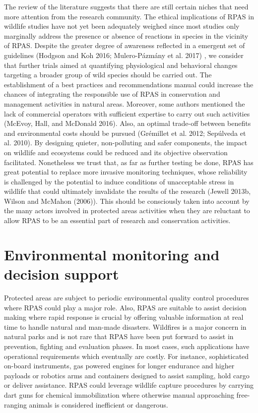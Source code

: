 \documentclass[]{interact}
\theoremstyle{plain}%
\theoremstyle{definition}
\theoremstyle{remark}
\begin{document}
The review of the literature suggests that there are still certain
niches that need more attention from the research community. The ethical
implications of RPAS in wildlife studies have not yet been adequately
weighed since most studies only marginally address the presence or
absence of reactions in species in the vicinity of RPAS. Despite the
greater degree of awareness reflected in a emergent set of guidelines
(Hodgson and Koh 2016; Mulero-Pázmány et al. 2017) , we consider that
further trials aimed at quantifying physiological and behavioral changes
targeting a broader group of wild species should be carried out. The
establishment of a best practices and recommendations manual could
increase the chances of integrating the responsible use of RPAS in
conservation and management activities in natural areas. Moreover, some
authors mentioned the lack of commercial operators with sufficient
expertise to carry out such activities (McEvoy, Hall, and McDonald
2016). Also, an optimal trade-off between benefits and environmental
costs should be pursued (Grémillet et al. 2012; Sepúlveda et al. 2010).
By designing quieter, non-polluting and safer components, the impact on
wildlife and ecosystems could be reduced and its objective observation
facilitated. Nonetheless we trust that, as far as further testing be
done, RPAS has great potential to replace more invasive monitoring
techniques, whose reliability is challenged by the potential to induce
conditions of unacceptable stress in wildlife that could ultimately
invalidate the results of the research (Jewell 2013b, Wilson and McMahon
(2006)). This should be consciously taken into account by the many
actors involved in protected areas activities when they are reluctant to
allow RPAS to be an essential part of research and conservation
activities.

\section{Environmental monitoring and decision
support}\label{environmental-monitoring-and-decision-support}

Protected areas are subject to periodic environmental quality control
procedures where RPAS could play a major role. Also, RPAS are suitable
to assist decision making where rapid response is crucial by offering
valuable information at real time to handle natural and man-made
disasters. Wildfires is a major concern in natural parks and is not rare
that RPAS have been put forward to assist in prevention, fighting and
evaluation phases. In most cases, such applications have operational
requirements which eventually are costly. For instance, sophisticated
on-board instruments, gas powered engines for longer endurance and
higher payloads or robotics arms and containers designed to assist
sampling, hold cargo or deliver assistance. RPAS could leverage wildlife
capture procedures by carrying dart guns for chemical immobilization
where otherwise manual approaching free-ranging animals is considered
inefficient or dangerous.
\end{document}

